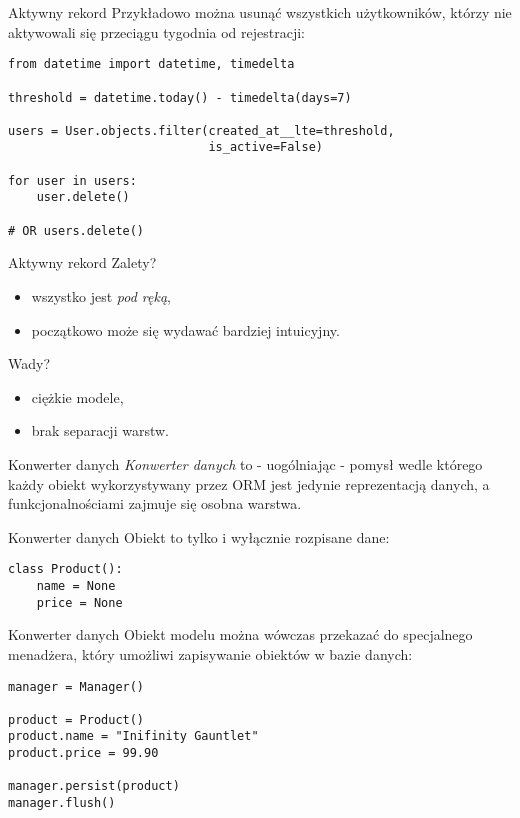 \begin{frame}[fragile]{Aktywny rekord}
	Przykładowo można usunąć wszystkich użytkowników, którzy nie aktywowali się przeciągu tygodnia od rejestracji:
	
	\begin{lstlisting}	
from datetime import datetime, timedelta

threshold = datetime.today() - timedelta(days=7)

users = User.objects.filter(created_at__lte=threshold,
                            is_active=False)

for user in users:
    user.delete()
    
# OR users.delete()
	\end{lstlisting}
\end{frame}

\begin{frame}[fragile]{Aktywny rekord}
	Zalety?
	\begin{itemize}
		\item wszystko jest \emph{pod ręką},
		\item początkowo może się wydawać bardziej intuicyjny.
	\end{itemize}
	
	Wady?
	\begin{itemize}
		\item ciężkie modele,
		\item brak separacji warstw.
	\end{itemize}
\end{frame}
	
\begin{frame}{Konwerter danych}
	\emph{Konwerter danych} to - uogólniając - pomysł wedle którego każdy obiekt wykorzystywany przez ORM jest jedynie reprezentacją danych, a funkcjonalnościami zajmuje się osobna warstwa.
\end{frame}

\begin{frame}[fragile]{Konwerter danych}
	Obiekt to tylko i wyłącznie rozpisane dane:

	\begin{lstlisting}	
class Product():
    name = None
    price = None
	\end{lstlisting}
\end{frame}

\begin{frame}[fragile]{Konwerter danych}
	Obiekt modelu można wówczas przekazać do specjalnego menadżera, który umożliwi zapisywanie obiektów w bazie danych:
	
	\begin{lstlisting}	
manager = Manager()

product = Product()
product.name = "Inifinity Gauntlet"
product.price = 99.90

manager.persist(product)
manager.flush()
	\end{lstlisting}
\end{frame}

